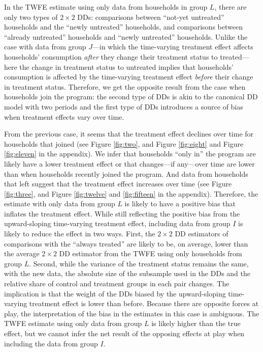 \documentclass[12pt]{article}
\begin{document}
In the TWFE estimate using only data from households in group $L$, there are only two types of $2 \times 2$  DDs: comparisons between \enquote{not-yet untreated} households and the \enquote{newly untreated} households, and comparisons between \enquote{already untreated} households and \enquote{newly untreated} households. Unlike the case with data from group $J$---in which the time-varying treatment effect affects households’ consumption \emph{after} they change their treatment status to treated---here the change in treatment status to untreated implies that households’ consumption is affected by the time-varying treatment effect \emph{before} their change in treatment status. Therefore, we get the opposite result from the case when households join the program: the second type of DDs is akin to the canonical DD model with two periods and the first type of DDs introduces a source of bias when treatment effects vary over time.

From the previous case, it seems that the treatment effect declines over time for households that joined (see Figure \ref{fig:two}, and Figure \ref{fig:eight} and Figure \ref{fig:eleven} in the appendix). We infer that households \enquote{only in} the program are likely have a lower treatment effect or that changes---if any---over time are lower than when households recently joined the program. And data from households that left suggest that the treatment effect increases over time (see Figure \ref{fig:three}, and Figure \ref{fig:twelve} and \ref{fig:fifteen} in the appendix). Therefore, the estimate with only data from group $L$ is likely to have a positive bias that inflates the treatment effect. While still reflecting the positive bias from the upward-sloping time-varying treatment effect, including data from group $I$ is likely to reduce the effect in two ways. First, the $2 \times 2 $ DD estimators of comparisons with the \enquote{always treated} are likely to be, on average, lower than the average  $2 \times 2$  DD estimator from the TWFE using only households from group $L$. Second, while the variance of the treatment status remains the same, with the new data, the absolute size of the subsample used in the DDs and the relative share of control and treatment groups in each pair changes. The implication is that the weight of the DDs biased by the upward-sloping time-varying treatment effect is lower than before. Because there are opposite forces at play, the interpretation of the bias in the estimates in this case is ambiguous. The TWFE estimate using only data from group $L$ is likely higher than the true effect, but we cannot infer the net result of the opposing effects at play when including the data from group $I$.
\end{document}
